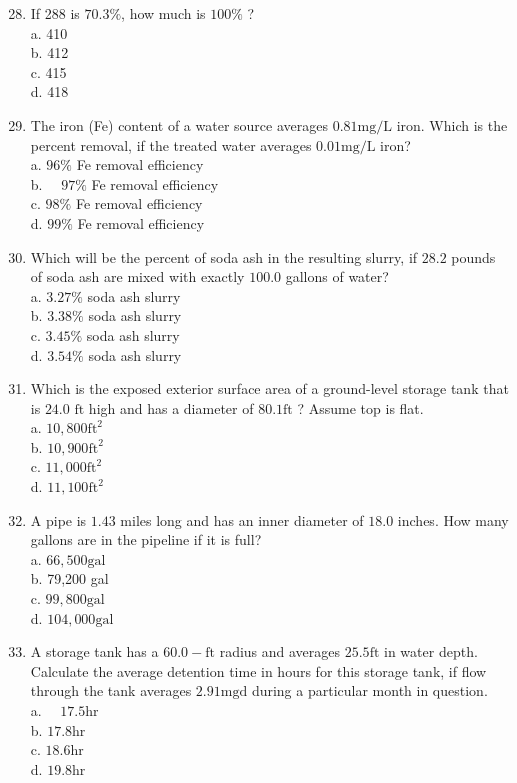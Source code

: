 \documentclass[10pt]{article}
\begin{document}
\begin{enumerate}
  \setcounter{enumi}{27}
  \item If 288 is $70.3 \%$, how much is $100 \%$ ?\\
a. 410\\
b. 412\\
c. 415\\
d. 418

  \item The iron (Fe) content of a water source averages $0.81 \mathrm{mg} / \mathrm{L}$ iron. Which is the percent removal, if the treated water averages $0.01 \mathrm{mg} / \mathrm{L}$ iron?\\
a. $96 \%$ Fe removal efficiency\\
b. $\quad 97 \%$ Fe removal efficiency\\
c. $98 \%$ Fe removal efficiency\\
d. $99 \%$ Fe removal efficiency

  \item Which will be the percent of soda ash in the resulting slurry, if $28.2$ pounds of soda ash are mixed with exactly $100.0$ gallons of water?\\
a. $3.27 \%$ soda ash slurry\\
b. $3.38 \%$ soda ash slurry\\
c. $3.45 \%$ soda ash slurry\\
d. $3.54 \%$ soda ash slurry

  \item Which is the exposed exterior surface area of a ground-level storage tank that is $24.0$ $\mathrm{ft}$ high and has a diameter of $80.1 \mathrm{ft}$ ? Assume top is flat.\\
a. $10,800 \mathrm{ft}^{2}$\\
b. $10,900 \mathrm{ft}^{2}$\\
c. $11,000 \mathrm{ft}^{2}$\\
d. $11,100 \mathrm{ft}^{2}$

  \item A pipe is $1.43$ miles long and has an inner diameter of $18.0$ inches. How many gallons are in the pipeline if it is full?\\
a. $66,500 \mathrm{gal}$\\
b. 79,200 gal\\
c. $99,800 \mathrm{gal}$\\
d. $104,000 \mathrm{gal}$

  \item A storage tank has a $60.0-\mathrm{ft}$ radius and averages $25.5 \mathrm{ft}$ in water depth. Calculate the average detention time in hours for this storage tank, if flow through the tank averages $2.91 \mathrm{mgd}$ during a particular month in question.\\
a. $\quad 17.5 \mathrm{hr}$\\
b. $17.8 \mathrm{hr}$\\
c. $18.6 \mathrm{hr}$\\
d. $19.8 \mathrm{hr}$ 


\end{enumerate}
\end{document}

